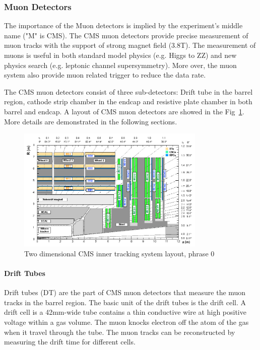 \subsubsection{Muon Detectors}

The importance of the Muon detectors is implied by the experiment’s middle name ("M" is CMS). The CMS muon detectors provide precise measurement of muon tracks with the support of strong magnet field (3.8T). The measurement of muons is useful in both standard model physics (e.g. Higgs to ZZ) and new physics search (e.g. leptonic channel supersymmetry). More over, the muon system also provide muon related trigger to reduce the data rate.

The CMS muon detectors consist of three sub-detectors: Drift tube in the barrel region, cathode strip chamber in the endcap and resistive plate chamber in both barrel and endcap. A layout of CMS muon detectors are showed in the Fig~\ref{fig:c3cms2dmuondets}. More details are demonstrated in the following sections. 

\begin{figure}[htbp]
 \begin{center}
  \includegraphics[width=0.8\textwidth]{figures/c3/c3_cms_2dmuondets.png}
 \end{center}
 \caption{Two dimensional CMS inner tracking system layout, phrase 0}
 \label{fig:c3cms2dmuondets}
\end{figure}

\paragraph{Drift Tubes}
Drift tubes (DT) are the part of CMS muon detectors that measure the muon tracks in the barrel region. The basic unit of the drift tubes is the drift cell. A drift cell is a 42mm-wide tube contains a thin conductive wire at high positive voltage within a gas volume. The muon knocks electron off the atom of the gas when it travel through the tube. The muon tracks can be reconstructed by measuring the drift time for different cells. 

